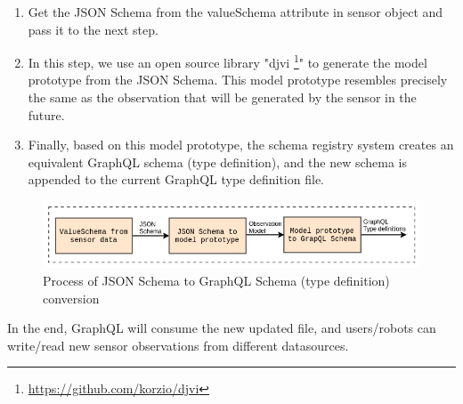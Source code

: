 	\begin{enumerate}
		\item Get the JSON Schema from the valueSchema attribute in sensor object and pass it to the next step.
		\item In this step, we use an open source library  "djvi \footnote{ \url{https://github.com/korzio/djvi}}" to generate the model prototype from the JSON Schema. This model prototype resembles precisely the same as the observation that will be generated by the sensor in the future.
		\item Finally, based on this model prototype, the schema registry system creates an equivalent GraphQL schema (type definition), and the new schema is appended to the current GraphQL type definition file.
	\end{enumerate}
	
	\begin{figure}[!htbp] 
		\begin{center}
			\includegraphics[scale=0.5]{./images/png/implementation/jsonscema_to_graphql}	
			\caption{Process of JSON Schema to GraphQL Schema (type definition) conversion}	
			\label{fig:jsonscema_to_graphql}	
		\end{center}
	\end{figure}

	In the end, GraphQL will consume the new updated file, and users/robots can write/read new sensor observations from different datasources.
	
